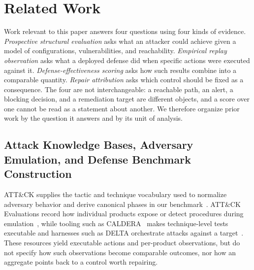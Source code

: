 \section{Related Work}
\label{sec:related-work}

Work relevant to this paper answers four questions using four kinds of evidence. \emph{Prospective structural evaluation} asks what an attacker could achieve given a model of configurations, vulnerabilities, and reachability. \emph{Empirical replay observation} asks what a deployed defense did when specific actions were executed against it. \emph{Defense-effectiveness scoring} asks how such results combine into a comparable quantity. \emph{Repair attribution} asks which control should be fixed as a consequence. The four are not interchangeable: a reachable path, an alert, a blocking decision, and a remediation target are different objects, and a score over one cannot be read as a statement about another. We therefore organize prior work by the question it answers and by its unit of analysis.

\subsection{Attack Knowledge Bases, Adversary Emulation, and Defense Benchmark Construction}
\label{subsec:rw-emulation-benchmark}

ATT\&CK supplies the tactic and technique vocabulary used to normalize adversary behavior and derive canonical phases in our benchmark~\cite{mitreAttack}. ATT\&CK Evaluations record how individual products expose or detect procedures during emulation~\cite{mitreAttackEvaluations}, while tooling such as CALDERA~\cite{caldera} makes technique-level tests executable and harnesses such as DELTA orchestrate attacks against a target~\cite{lee2017delta}. These resources yield executable actions and per-product observations, but do not specify how such observations become comparable outcomes, nor how an aggregate points back to a control worth repairing.

